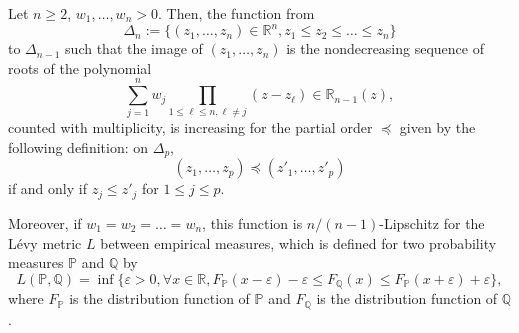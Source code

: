\documentclass[10pt,a4paper]{amsart}
\begin{document}
\begin{theorem} \label{monotonicity}
Let $n \geq 2$, $w_1, \dots, w_n > 0$. Then, the function from $$ \Delta_n := \{ (z_1, \dots, z_n)\in  \mathbb{R}^n, z_1 \leq z_2 \leq \dots \leq z_n \} $$ to $\Delta_{n-1}$
such that the image of $(z_1, \dots, z_n)$ 
is the nondecreasing sequence of roots of the polynomial 
$$\sum_{j=1}^n w_j \prod_{1 \leq \ell \leq n, \ell \neq j} (z - z_\ell) \in \mathbb{R}_{n-1}(z),$$
counted with multiplicity, is increasing for the partial order $\preccurlyeq$ given by the following definition: on $\Delta_p$, 
$$(z_1, \dots, z_p) \preccurlyeq (z'_1, \dots, z'_p) $$
if and only if $z_j \leq z'_j$ for $1 \leq j \leq p$.

Moreover, if $w_1 = w_2 = \dots = w_n$, this function is $n/(n-1)$-Lipschitz for the L\'evy metric $L$ between empirical measures, which is defined for two probability measures $\mathbb{P}$ and 
$\mathbb{Q}$ by 
$$L(\mathbb{P}, \mathbb{Q}) = 
\inf \{\varepsilon > 0, \forall x \in \mathbb{R},
F_{\mathbb{P}} (x - \varepsilon ) - \varepsilon \leq F_{\mathbb{Q}}(x) \leq F_{\mathbb{P}} (x + \varepsilon ) + \varepsilon  \},$$
where $F_{\mathbb{P}}$ is the distribution function of $\mathbb{P}$ and $F_{\mathbb{Q}}$ is the distribution function of $\mathbb{Q}$. 



\end{theorem}
\end{document}
